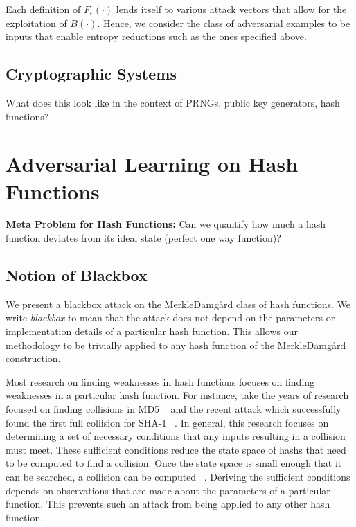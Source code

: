 Each definition of $F_{\epsilon}(\cdot)$ lends itself to various attack vectors that allow for the exploitation of $B(\cdot)$. Hence, we consider the class of adversarial examples to be inputs that enable entropy reductions such as the ones specified above. 

\subsection{Cryptographic Systems}
What does this look like in the context of PRNGs, public key generators, hash functions?

\section{Adversarial Learning on Hash Functions}

\textbf{Meta Problem for Hash Functions:} Can we quantify how much a hash function deviates from its ideal state (perfect one way function)?

\subsection{Notion of Blackbox}
We present a blackbox attack on the Merkle{\textendash}Damg\r{a}rd class of hash functions. We write \emph{blackbox} to mean that the attack does not depend on the parameters or implementation details of a particular hash function. This allows our methodology to be trivially applied to any hash function of the Merkle{\textendash}Damg\r{a}rd construction. 

Most research on finding weaknesses in hash functions focuses on finding weaknesses in a particular hash function. For instance, take the years of research focused on finding collisions in MD5 ~\cite{klima2005finding, liang2007improved, wang2005break, klima2006tunnels} and the recent attack which successfully found the first full collision for SHA-1 ~\cite{stevens2017first}. In general, this research focuses on determining a set of necessary conditions that any inputs resulting in a collision must meet. These sufficient conditions reduce the state space of hashs that need to be computed to find a collision. Once the state space is small enough that it can be searched, a collision can be computed ~\cite{sasaki2006construct}. Deriving the sufficient conditions depends on observations that are made about the parameters of a particular function. This prevents such an attack from being applied to any other hash function. 

